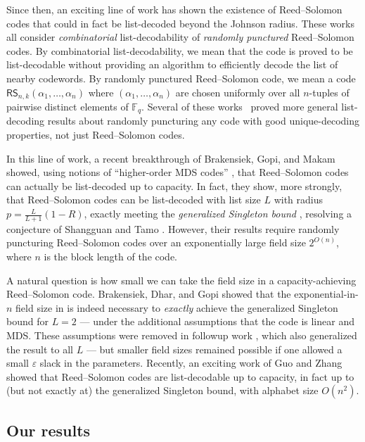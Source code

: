 \documentclass{article}[11pt]
\def\RS{\mathsf{RS}}
\begin{document}
Since then, an exciting line of work \cite{RudraW14, ST20, GLSTW21, FKS22, GST22, BGM23, GZ23} has shown the existence of Reed--Solomon codes that could in fact be list-decoded beyond the Johnson radius.
These works all consider \emph{combinatorial} list-decodability of \emph{randomly punctured} Reed--Solomon codes.
By combinatorial list-decodability, we mean that the code is proved to be list-decodable without providing an algorithm to efficiently decode the list of nearby codewords.
By randomly punctured Reed--Solomon code, we mean a code $\RS_{n,k}(\alpha_1,\dots,\alpha_n)$ where $(\alpha_1,\dots,\alpha_n)$ are chosen uniformly over all $n$-tuples of pairwise distinct elements of $\mathbb{F}_q$. 
Several of these works~\cite{RudraW14, FKS22, GST22} proved more general list-decoding results about randomly puncturing any code with good unique-decoding properties, not just Reed--Solomon codes.



In this line of work, a recent breakthrough of Brakensiek, Gopi, and Makam~\cite{BGM23} showed, using notions of ``higher-order MDS codes'' \cite{BGM22,Roth22}, that Reed--Solomon codes can actually be list-decoded up to capacity.
In fact, they show, more strongly, that Reed--Solomon codes can be list-decoded with list size $L$ with radius $p=\frac{L}{L+1}(1-R)$, exactly meeting the \emph{generalized Singleton bound} \cite{ST20}, resolving a conjecture of Shangguan and Tamo \cite{ST20}. 
However, their results require randomly puncturing Reed--Solomon codes over an exponentially large field size $2^{O(n)}$, where $n$ is the block length of the code.

A natural question is how small we can take the field size in a capacity-achieving Reed--Solomon code.
Brakensiek, Dhar, and Gopi \cite[Corollary 1.7, Theorem 1.8]{BDG22} showed that the exponential-in-$n$ field size in \cite{BGM23} is indeed necessary to \emph{exactly} achieve the generalized Singleton bound for $L=2$  --- under the additional assumptions that the code is linear and MDS. These assumptions were removed in followup work \cite{AGL24}, which also generalized the result to all $L$ --- but smaller field sizes remained possible if one allowed a small $\varepsilon$ slack in the parameters.
  Recently, an exciting work of Guo and Zhang \cite{GZ23} showed that Reed--Solomon codes are list-decodable up to capacity, in fact up to (but not exactly at) the generalized Singleton bound, with alphabet size $O(n^2)$. 

  \subsection{Our results}
  \label{subsec:results}
\end{document}
